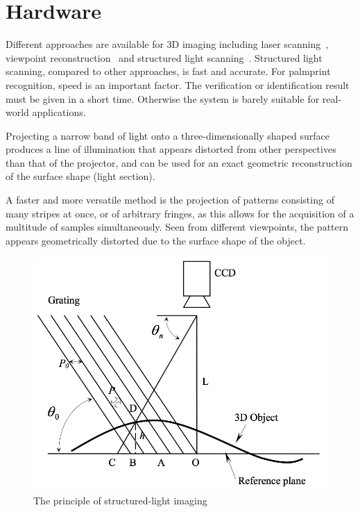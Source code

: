 \section{Hardware}
\label{sec:pastwork:hardware}


Different approaches are available for 3D imaging including laser scanning~\cite{Blais:1988te}, viewpoint reconstruction~\cite{Hartley:2000un} and structured light scanning~\cite{Halioua:1984ue}. Structured light scanning, compared to other approaches, is fast and accurate. For palmprint recognition, speed is an important factor. The verification or identification result must be given in a short time. Otherwise the system is barely suitable for real-world applications.


Projecting a narrow band of light onto a three-dimensionally shaped surface produces a line of illumination that appears distorted from other perspectives than that of the projector, and can be used for an exact geometric reconstruction of the surface shape (light section).

A faster and more versatile method is the projection of patterns consisting of many stripes at once, or of arbitrary fringes, as this allows for the acquisition of a multitude of samples simultaneously. Seen from different viewpoints, the pattern appears geometrically distorted due to the surface shape of the object.

\begin{figure}[htb]
  \begin{center}
    \includegraphics[width=0.9\linewidth]{ch-pastwork/figures/sli}
    \caption[The principle of structured-light imaging]{The principle of structured-light imaging\cite{Li:2009eq}}
    \label{fig:pastwork:sli}
  \end{center}
\end{figure}

